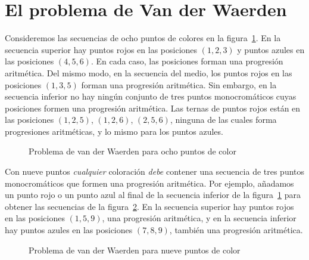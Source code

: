
\section{El problema de Van der Waerden}\label{s.van}

Consideremos las secuencias de ocho puntos de colores en la figura~\ref{f.vdw1}. En la secuencia superior hay puntos rojos en las posiciones $(1,2,3)$ y puntos azules en las posiciones $(4,5,6)$. En cada caso, las posiciones forman una progresión aritmética. Del mismo modo, en la secuencia del medio, los puntos rojos en las posiciones $(1,3,5)$ forman una progresión aritmética. Sin embargo, en la secuencia inferior no hay ningún conjunto de tres puntos monocromáticos cuyas posiciones formen una progresión aritmética. 
Las ternas de puntos rojos están en las posiciones $(1,2,5)$, $(1,2,6)$, $(2,5,6)$, ninguna de las cuales forma progresiones aritméticas, y lo mismo para los puntos azules.

\begin{figure}[htb]
\begin{center}
\end{center}
\caption{Problema de van der Waerden para ocho puntos de color}\label{f.vdw1}
\end{figure}

Con nueve puntos \emph{cualquier} coloración \emph{debe} contener una secuencia de tres puntos monocromáticos que formen una progresión aritmética. Por ejemplo, añadamos un punto rojo o un punto azul al final de la secuencia inferior de la figura~\ref{f.vdw1} para obtener las secuencias de la figura~\ref{f.vdw2}. En la secuencia superior hay puntos rojos en las posiciones $(1,5,9)$, una progresión aritmética, y en la secuencia inferior hay puntos azules en las posiciones $(7,8,9)$, también una progresión aritmética.
\begin{figure}[htb]
\begin{center}
\end{center}
\caption{Problema de van der Waerden para nueve puntos de color}\label{f.vdw2}
\end{figure}

